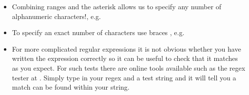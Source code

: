 \documentclass[letterpaper,10pt,english,openany]{sphinxmanual}
\begin{document}
\begin{sphinxVerbatim}[commandchars=\\\{\}]
 
   
   
   
  
\end{sphinxVerbatim}
\begin{itemize}
\item {} 
Combining ranges and the asterisk allows us to specify any number of
alphanumeric characters!, e.g.

\end{itemize}

\begin{sphinxVerbatim}[commandchars=\\\{\}]
 
     
  
\end{sphinxVerbatim}
\begin{itemize}
\item {} 
To specify an exact number of characters use braces \sphinxcode{\sphinxupquote{\{\}}}, e.g.

\end{itemize}

\begin{sphinxVerbatim}[commandchars=\\\{\}]
 
   
  
\end{sphinxVerbatim}
\begin{itemize}
\item {} 
For more complicated regular expressions it is not obvious whether
you have written the expression correctly so it can be useful to
check that it matches as you expect. For such tests there are online
tools available such as the regex tester at
. Simply
type in your regex and a test string and it will tell you a match can
be found within your string.

\end{itemize}
\end{document}
